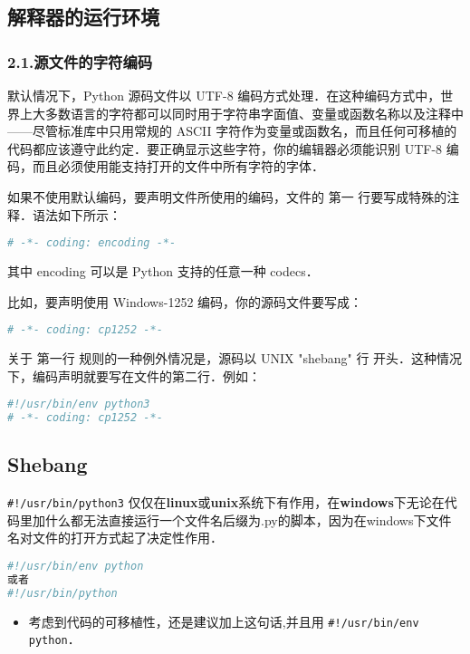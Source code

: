 \subsection{解释器的运行环境}

\subsubsection{2.1.源文件的字符编码}

默认情况下，Python 源码文件以 UTF-8 编码方式处理．在这种编码方式中，世界上大多数语言的字符都可以同时用于字符串字面值、变量或函数名称以及注释中——尽管标准库中只用常规的 ASCII 字符作为变量或函数名，而且任何可移植的代码都应该遵守此约定．要正确显示这些字符，你的编辑器必须能识别 UTF-8 编码，而且必须使用能支持打开的文件中所有字符的字体．

如果不使用默认编码，要声明文件所使用的编码，文件的 第一 行要写成特殊的注释．语法如下所示：

\begin{lstlisting}[language=python]
# -*- coding: encoding -*-
\end{lstlisting}
其中 encoding 可以是 Python 支持的任意一种 codecs．

比如，要声明使用 Windows-1252 编码，你的源码文件要写成：

\begin{lstlisting}[language=python]
# -*- coding: cp1252 -*-
\end{lstlisting}
关于 第一行 规则的一种例外情况是，源码以 UNIX "shebang" 行 开头．这种情况下，编码声明就要写在文件的第二行．例如：

\begin{lstlisting}[language=python]
#!/usr/bin/env python3
# -*- coding: cp1252 -*-
\end{lstlisting}

\subsection{Shebang}
\verb|#!/usr/bin/python3| 仅仅在\textbf{linux}或\textbf{unix}系统下有作用，在\textbf{windows}下无论在代码里加什么都无法直接运行一个文件名后缀为.py的脚本，因为在windows下文件名对文件的打开方式起了决定性作用．
\begin{lstlisting}[language=python]
#!/usr/bin/env python
或者
#!/usr/bin/python
\end{lstlisting}
\begin{itemize}
\item 考虑到代码的可移植性，还是建议加上这句话,并且用 \verb|#!/usr/bin/env python|．
\end{itemize}

